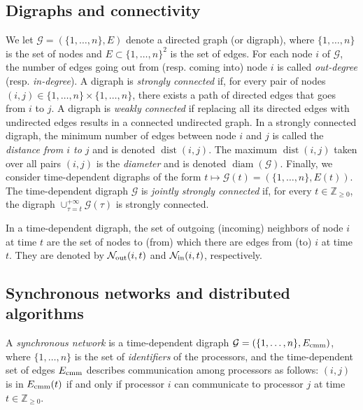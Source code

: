 \documentclass[onecolumn,journal,letterpaper]{IEEEtran}
\newcommand{\integernonnegative}{{\mathbb{Z}_{\geq0}}}
\newcommand{\naturalzero}{\mathbb{N}_0}
\renewcommand{\naturalzero}{\integernonnegative}
\newcommand{\subscr}[2]{{#1}_{\textup{#2}}}
\newcommand{\union}{\cup}
\newcommand{\diam}{\operatorname{diam}}
\newcommand{\GG}{\mathcal{G}}
\newcommand{\until}[1]{\{1,\dots,#1\}}
\newcommand{\outnbrs}{\subscr{\mathcal{N}}{out}}
\newcommand{\innbrs}{\subscr{\mathcal{N}}{in}}
\newcommand{\dist}{\operatorname{dist}}
\begin{document}
\subsection{Digraphs and connectivity}
We let $\GG = (\until{n}, E)$ denote a directed graph (or digraph), where
$\until{n}$ is the set of nodes and $E\subset \until{n}^2$ is the set of
edges.  For each node $i$ of $\GG$, the number of edges going out from
(resp. coming into) node $i$ is called \emph{out-degree}
(resp. \emph{in-degree}).
A digraph is \emph{strongly connected} if, for every pair of nodes $(i, j)
\in \until{n}\times\until{n}$, there exists a path of directed edges that
goes from $i$ to $j$. A digraph is \emph{weakly connected} if replacing all
its directed edges with undirected edges results in a connected undirected
graph. In a strongly connected digraph, the minimum number of edges between
node $i$ and $j$ is called the \emph{distance from $i$ to $j$} and is
denoted $\dist(i,j)$. The maximum $\dist(i,j)$ taken over all pairs $(i,j)$
is the \emph{diameter} and is denoted $\diam(\GG)$.  Finally, we consider
time-dependent digraphs of the form $t\mapsto \GG(t) = (\until{n},
E(t))$. The time-dependent digraph $\GG$ is \emph{jointly strongly
  connected} if, for every $t \in \naturalzero$, the digraph
$\union_{\tau=t}^{+\infty} \GG(\tau)$ is strongly connected.

In a time-dependent digraph, the set of outgoing (incoming) neighbors of
node $i$ at time $t$ are the set of nodes to (from) which there are edges
from (to) $i$ at time $t$. They are denoted by $\outnbrs(i,t)$ and
$\innbrs(i,t)$, respectively.


\subsection{Synchronous networks and distributed algorithms}
\label{subsec:networkmodel+distributedalgos}
A \emph{synchronous network} is a time-dependent digraph $\GG = (\until{n},
\subscr{E}{cmm})$, where $\until{n}$ is the set of \emph{identifiers} of
the processors, and the time-dependent set of edges $\subscr{E}{cmm}$
describes communication among processors as follows: $(i,j)$ is in
$\subscr{E}{cmm}(t)$ if and only if processor $i$ can communicate to
processor $j$ at time $t\in\integernonnegative$.
\end{document}
